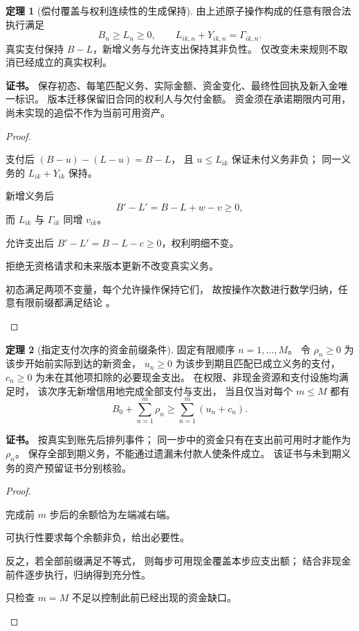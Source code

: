 \documentclass[UTF8,12pt,a4paper,openany,fontset=none,zihao=false]{ctexrep}
\theoremstyle{definition}
\newtheorem{theorem}{定理}[chapter]
\newenvironment{certificate}{\par\noindent\textbf{证书。}\ignorespaces}{\par}
\newcommand{\1}{\mathbf 1}
\begin{document}
\begin{theorem}[偿付覆盖与权利连续性的生成保持]
\label{part:thm-ledger-invariant}
由上述原子操作构成的任意有限合法执行满足
\[
 B_n\ge L_n\ge0,\qquad
 L_{ik,n}+Y_{ik,n}=\Gamma_{ik,n}.
\]
真实支付保持 \(B-L\)，新增义务与允许支出保持其非负性。
仅改变未来规则不取消已经成立的真实权利。
\end{theorem}
\begin{certificate}
保存初态、每笔匹配义务、实际金额、资金变化、最终性回执及新入金唯一标识。
版本迁移保留旧合同的权利人与欠付金额。
资金须在承诺期限内可用，尚未实现的追偿不作为当前可用资产。
\end{certificate}
\begin{proof}
\begin{semanticsteps}
\item 支付后 \((B-u)-(L-u)=B-L\)，
且 \(u\le L_{ik}\) 保证未付义务非负；
同一义务的 \(L_{ik}+Y_{ik}\) 保持。
\item 新增义务后
\[
 B'-L'=B-L+w-v\ge0,
\]
而 \(L_{ik}\) 与 \(\Gamma_{ik}\) 同增 \(v_{ik}\)。
\item 允许支出后 \(B'-L'=B-L-c\ge0\)，权利明细不变。
\item 拒绝无资格请求和未来版本更新不改变真实义务。
\item 初态满足两项不变量，每个允许操作保持它们，
故按操作次数进行数学归纳，任意有限前缀都满足结论
\cite{InternalTheory,InternalEconomics}。
\end{semanticsteps}
\end{proof}

\begin{theorem}[指定支付次序的资金前缀条件]
\label{part:thm-prefix-funding}
固定有限顺序 \(n=1,\ldots,M\)。
令 \(\rho_n\ge0\) 为该步开始前实际到达的新资金，
\(u_n\ge0\) 为该步到期且匹配已成立义务的支付，
\(c_n\ge0\) 为未在其他项扣除的必要现金支出。
在权限、非现金资源和支付设施均满足时，
该次序无新增信用地完成全部支付与支出，
当且仅当对每个 \(m\le M\) 都有
\[
 B_0+\sum_{n=1}^{m}\rho_n
 \ge\sum_{n=1}^{m}(u_n+c_n).
\]
\end{theorem}
\begin{certificate}
按真实到账先后排列事件；
同一步中的资金只有在支出前可用时才能作为 \(\rho_n\)。
保存全部到期义务，不能通过遗漏未付款人使条件成立。
该证书与未到期义务的资产预留证书分别核验。
\end{certificate}
\begin{proof}
\begin{semanticsteps}
\item 完成前 \(m\) 步后的余额恰为左端减右端。
\item 可执行性要求每个余额非负，给出必要性。
\item 反之，若全部前缀满足不等式，
则每步可用现金覆盖本步应支出额；
结合非现金前件逐步执行，归纳得到充分性。
\item 只检查 \(m=M\) 不足以控制此前已经出现的资金缺口。
\end{semanticsteps}
\end{proof}
\end{document}
